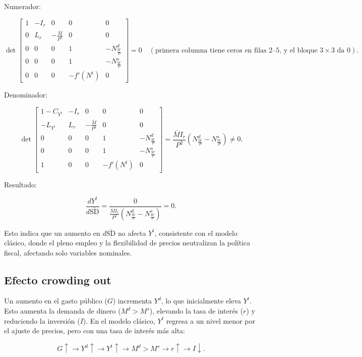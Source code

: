 \documentclass[
  doc,
  floatsintext,
  longtable,
  a4paper,
  nolmodern,
  notxfonts,
  notimes,
  colorlinks=true,linkcolor=blue,citecolor=blue,urlcolor=blue]{apa7}
\begin{document}
\begin{enumerate}
  Numerador:

  \[
  \det \begin{bmatrix}
  1 & -I_r & 0 & 0 & 0 \\
  0 & L_r & -\frac{\bar{M}}{P^2} & 0 & 0 \\
  0 & 0 & 0 & 1 & -N^d_{\frac{W}{P}} \\
  0 & 0 & 0 & 1 & -N^s_{\frac{W}{P}} \\
  0 & 0 & 0 & -f'(N^t) & 0
  \end{bmatrix} = 0 \quad (\text{primera columna tiene ceros en filas 2--5, y el bloque } 3 \times 3 \text{ da } 0).
  \]

  Denominador:

  \[
  \det \begin{bmatrix}
  1 - C_{Y^t} & -I_r & 0 & 0 & 0 \\
  -L_{Y^t} & L_r & -\frac{\bar{M}}{P^2} & 0 & 0 \\
  0 & 0 & 0 & 1 & -N^d_{\frac{W}{P}} \\
  0 & 0 & 0 & 1 & -N^s_{\frac{W}{P}} \\
  1 & 0 & 0 & -f'(N^t) & 0
  \end{bmatrix} = \frac{\bar{M} I_r}{P^2} \left( N^d_{\frac{W}{P}} - N^s_{\frac{W}{P}} \right) \neq 0.
  \]

  Resultado:

  \[
  \frac{dY^t}{d\bar{\mathrm{SD}}} = \frac{0}{\frac{\bar{M} I_r}{P^2} \left( N^d_{\frac{W}{P}} - N^s_{\frac{W}{P}} \right)} = 0.
  \]

  Esto indica que un aumento en \(d\bar{\mathrm{SD}}\) no afecta
  \(Y^t\), consistente con el modelo clásico, donde el pleno empleo y la
  flexibilidad de precios neutralizan la política fiscal, afectando solo
  variables nominales.
\end{enumerate}

\subsection{Efecto crowding out}\label{efecto-crowding-out}

Un aumento en el gasto público (\(G\)) incrementa \(Y^d\), lo que
inicialmente eleva \(Y^t\). Esto aumenta la demanda de dinero
(\(M^d > M^s\)), elevando la tasa de interés (\(r\)) y reduciendo la
inversión (\(I\)). En el modelo clásico, \(Y^t\) regresa a un nivel
menor por el ajuste de precios, pero con una tasa de interés más alta:

\[
G \uparrow \rightarrow Y^d \uparrow \rightarrow Y^t \uparrow \rightarrow M^d > M^s \rightarrow r \uparrow \rightarrow I \downarrow.
\]
\end{document}
